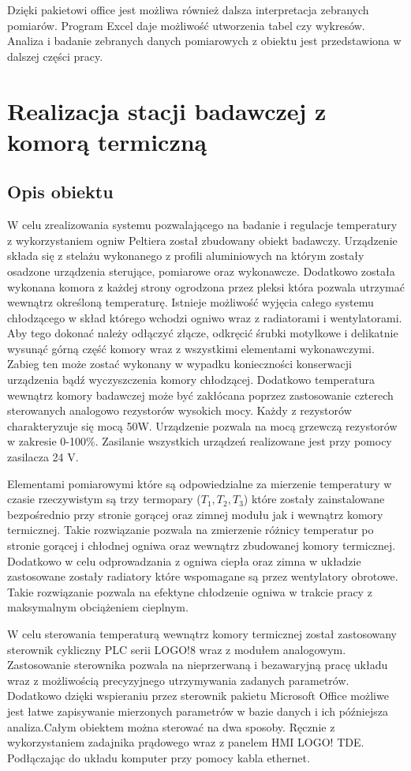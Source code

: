 \documentclass[oneside]{mgr}
\begin{document}
Dzięki pakietowi office jest możliwa również dalsza interpretacja zebranych pomiarów. Program Excel daje możliwość utworzenia tabel czy wykresów. Analiza i badanie zebranych danych pomiarowych z obiektu jest przedstawiona w dalszej części pracy.

\chapter{Realizacja stacji badawczej z komorą termiczną}
\section{Opis obiektu}

W celu zrealizowania systemu pozwalającego na badanie i regulacje temperatury z wykorzystaniem ogniw Peltiera został zbudowany obiekt badawczy. Urządzenie składa się z stelażu wykonanego z profili aluminiowych na którym zostały osadzone urządzenia sterujące, pomiarowe oraz wykonawcze. Dodatkowo została wykonana komora z każdej strony ogrodzona przez pleksi która pozwala utrzymać wewnątrz określoną temperaturę. Istnieje możliwość wyjęcia całego systemu chłodzącego w skład którego wchodzi ogniwo wraz z radiatorami i wentylatorami. Aby tego dokonać należy odłączyć złącze, odkręcić śrubki motylkowe i delikatnie wysunąć górną część komory wraz z wszystkimi elementami wykonawczymi. Zabieg ten może zostać wykonany w wypadku konieczności konserwacji urządzenia bądź wyczyszczenia komory chłodzącej. Dodatkowo temperatura wewnątrz komory badawczej może być zakłócana poprzez zastosowanie czterech sterowanych analogowo rezystorów wysokich mocy. Każdy z rezystorów charakteryzuje się mocą 50W. Urządzenie pozwala na mocą grzewczą rezystorów w zakresie 0-100\%. Zasilanie wszystkich urządzeń realizowane jest przy pomocy zasilacza 24 V.

Elementami pomiarowymi które są odpowiedzialne za mierzenie temperatury  w czasie rzeczywistym są trzy termopary ($T_1, T_2, T_3$) które zostały zainstalowane bezpośrednio przy stronie gorącej oraz zimnej modułu jak i wewnątrz komory termicznej. Takie rozwiązanie pozwala na zmierzenie różnicy temperatur po stronie gorącej i chłodnej ogniwa oraz wewnątrz zbudowanej komory termicznej. Dodatkowo w celu odprowadzania z ogniwa ciepła oraz zimna w układzie zastosowane zostały radiatory które wspomagane są przez wentylatory obrotowe. Takie rozwiązanie pozwala na efektyne chłodzenie ogniwa w trakcie pracy z maksymalnym obciążeniem cieplnym.

W celu sterowania temperaturą wewnątrz komory termicznej został zastosowany sterownik cykliczny PLC serii LOGO!8 wraz z modułem analogowym. Zastosowanie sterownika pozwala na nieprzerwaną i bezawaryjną pracę układu wraz z możliwością precyzyjnego utrzymywania zadanych parametrów. Dodatkowo dzięki wspieraniu przez sterownik pakietu Microsoft Office możliwe jest łatwe zapisywanie mierzonych parametrów w bazie danych i ich późniejsza analiza.Całym obiektem można sterować na dwa sposoby. Ręcznie z wykorzystaniem zadajnika prądowego wraz z panelem HMI LOGO! TDE. Podłączając do układu komputer przy pomocy kabla ethernet. 
\end{document}
